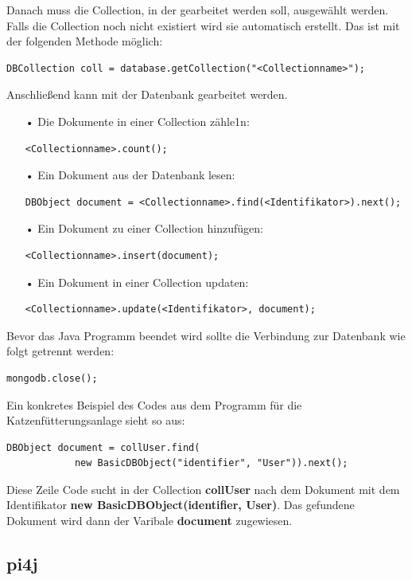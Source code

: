 Danach muss die Collection, in der gearbeitet werden soll, ausgewählt werden. Falls die Collection noch nicht existiert wird sie automatisch erstellt. Das ist mit der folgenden Methode möglich:
\begin{lstlisting}[style=JavaStyle]
	DBCollection coll = database.getCollection("<Collectionname>");
\end{lstlisting}
Anschließend kann mit der Datenbank gearbeitet werden. 
\begin{itemize}
\item[•] Die Dokumente in einer Collection zähle1n:
\begin{lstlisting}[style=JavaStyle]
	<Collectionname>.count();
\end{lstlisting}
\item[•] Ein Dokument aus der Datenbank lesen:
\begin{lstlisting}[style=JavaStyle]
	DBObject document = <Collectionname>.find(<Identifikator>).next();
\end{lstlisting}
\item[•] Ein Dokument zu einer Collection hinzufügen:
\begin{lstlisting}[style=JavaStyle]
	<Collectionname>.insert(document);
\end{lstlisting}	
\item[•] Ein Dokument in einer Collection updaten:
\begin{lstlisting}[style=JavaStyle]
	<Collectionname>.update(<Identifikator>, document);
\end{lstlisting}
\end{itemize}

Bevor das Java Programm beendet wird sollte die Verbindung zur Datenbank wie folgt getrennt werden: 
\begin{lstlisting}[style=JavaStyle]
	mongodb.close();
\end{lstlisting}

Ein konkretes Beispiel des Codes aus dem Programm für die Katzenfütterungsanlage sieht so aus:
\begin{lstlisting}[style=JavaStyle]
	DBObject document = collUser.find(
			new BasicDBObject("identifier", "User")).next();
\end{lstlisting}
Diese Zeile Code sucht in der Collection \textbf{collUser} nach dem Dokument mit dem Identifikator \textbf{new BasicDBObject(\grqq{}identifier\grqq{}, \grqq{}User\grqq{})}. Das gefundene Dokument wird dann der Varibale \textbf{document} zugewiesen. 


\subsection{pi4j}

